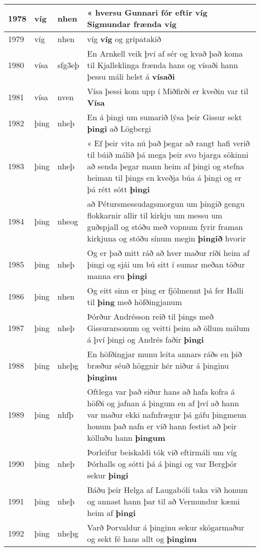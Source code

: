 \documentclass{article}
\begin{document}
\begin{longtable}{p{1cm}|p{1cm}|p{1cm}|p{13cm}}
\hline
1978&víg&nhen&« hversu Gunnari fór eftir víg Sigmundar frænda \textbf{víg} \\
\hline
1979&víg&nhen&víg \textbf{víg} og gripatakið\\
\hline
1980&vísa&sfg3eþ&En Arnkell veik því af sér og kvað það koma til Kjalleklinga frænda hans og vísaði hann þessu máli helst á \textbf{vísaði} \\
\hline
1981&vísa&nven&Vísa þessi kom upp í Miðfirði er kveðin var til \textbf{Vísa} \\
\hline
1982&þing&nheþ&En á þingi um sumarið lýsa þeir Gissur sekt \textbf{þingi} að Lögbergi\\
\hline
1983&þing&nheþ&« Ef þeir vita nú það þegar að rangt hafi verið til búið málið þá mega þeir svo bjarga sökinni að senda þegar mann heim af þingi og stefna heiman til þings en kveðja búa á þingi og er þá rétt sótt \textbf{þingi} \\
\hline
1984&þing&nheog&að Pétursmessudagsmorgun um þingið gengu flokkarnir allir til kirkju um messu um guðspjall og stóðu með vopnum fyrir framan kirkjuna og stóðu sínum megin \textbf{þingið} hvorir\\
\hline
1985&þing&nheþ&Og er það mitt ráð að hver maður ríði heim af þingi og sjái um bú sitt í sumar meðan töður manna eru \textbf{þingi} \\
\hline
1986&þing&nhen&Og eitt sinn er þing er fjölmennt þá fer Halli til \textbf{þing} með höfðingjanum\\
\hline
1987&þing&nheþ&Þórður Andrésson reið til þings með Gissurarsonum og veitti þeim að öllum málum á því þingi og Andrés faðir \textbf{þingi} \\
\hline
1988&þing&nheþg&En höfðingjar munu leita annars ráðs en þið bræður séuð höggnir hér niður á þinginu \textbf{þinginu} \\
\hline
1989&þing&nhfþ&Oftlega var það siður hans að hafa kofra á höfði og jafnan á þingum en af því að hann var maður ekki nafnfrægur þá gáfu þingmenn honum það nafn er við hann festist að þeir kölluðu hann \textbf{þingum} \\
\hline
1990&þing&nheþ&Þorleifur beiskaldi tók við eftirmáli um víg Þórhalls og sótti þá á þingi og var Bergþór sekur \textbf{þingi} \\
\hline
1991&þing&nheþ&Báðu þeir Helga af Laugabóli taka við honum og annast hann þar til að Vermundur kæmi heim af \textbf{þingi} \\
\hline
1992&þing&nheþg&Varð Þorvaldur á þinginu sekur skógarmaður og sekt fé hans allt og \textbf{þinginu} \\

\end{longtable}
\end{document}
